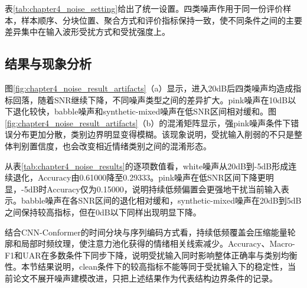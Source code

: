 表\ref{tab:chapter4_noise_setting}给出了统一设置。四类噪声作用于同一份评价样本，样本顺序、分块位置、聚合方式和评价指标保持一致，使不同条件之间的主要差异集中在输入波形受扰方式和受扰强度上。

\subsection{结果与现象分析}



图\ref{fig:chapter4_noise_result_artifacts}（a）显示，进入20dB后四类噪声均造成指标回落，随着SNR继续下降，不同噪声类型之间的差异扩大。pink噪声在10dB以下退化较快，babble噪声和synthetic-mixed噪声在低SNR区间相对缓和。图\ref{fig:chapter4_noise_result_artifacts}（b）的混淆矩阵显示，强pink噪声条件下错误分布更加分散，类别边界明显变得模糊。该现象说明，受扰输入削弱的不只是整体判别置信度，也会改变相近情绪类别之间的混淆形态。

从表\ref{tab:chapter4_noise_results}的逐项数值看，white噪声从20dB到-5dB形成连续退化，Accuracy由0.61000降至0.29333。pink噪声在低SNR区间下降更明显，-5dB时Accuracy仅为0.15000，说明持续低频偏置会更强地干扰当前输入表示。babble噪声在各SNR区间的退化相对缓和，synthetic-mixed噪声在20dB到5dB之间保持较高指标，但在0dB以下同样出现明显下降。

结合CNN-Conformer的时间分块与序列编码方式看，持续低频覆盖会压缩能量轮廓和局部时频纹理，使注意力池化获得的情绪相关线索减少。Accuracy、Macro-F1和UAR在多数条件下同步下降，说明受扰输入同时影响整体正确率与类别均衡性。本节结果说明，clean条件下的较高指标不能等同于受扰输入下的稳定性，当前论文不展开噪声建模改进，只把上述结果作为代表结构边界条件的记录。

